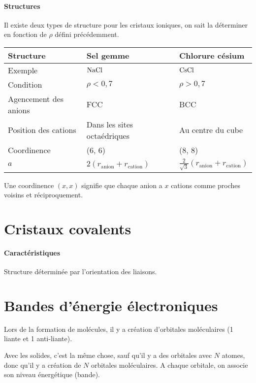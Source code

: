 \paragraph{Structures}
Il existe deux types de structure pour les cristaux ioniques,
on sait la déterminer en fonction de $\rho$ défini précédemment.

\begin{center}
  \begin{tabular}{|l|l|l|}
    \hline
    Structure & Sel gemme & Chlorure césium\\
    \hline
    Exemple & $\ce{NaCl}$ & $\ce{CsCl}$\\
    \hline
    Condition & $\rho < 0,7$ & $\rho > 0,7$\\
    \hline
    Agencement des anions & FCC & BCC\\
    \hline
    Position des cations & Dans les sites octaédriques & Au centre du cube\\
    \hline
    Coordinence & (6, 6) & (8, 8)\\
    \hline
    $a$ & $2 (r_\mathrm{anion} + r_\mathrm{cation})$ & $\frac{2}{\sqrt{3}} (r_\mathrm{anion} + r_\mathrm{cation})$\\
    \hline
  \end{tabular}
\end{center}
Une coordinence $(x, x)$ signifie que chaque anion a $x$ cations comme proches voisins et réciproquement.

\section{Cristaux covalents}

\paragraph{Caractéristiques}
Structure déterminée par l'orientation des liaisons.

\section{Bandes d'énergie électroniques}

Lors de la formation de molécules,
il y a création d'orbitales moléculaires (1 liante et 1 anti-liante).

Avec les solides,
c'est la même chose,
sauf qu'il y a des orbitales avec $N$ atomes,
donc qu'il y a création de $N$ orbitales moléculaires.
A chaque orbitale, on associe son niveau énergétique (bande).

